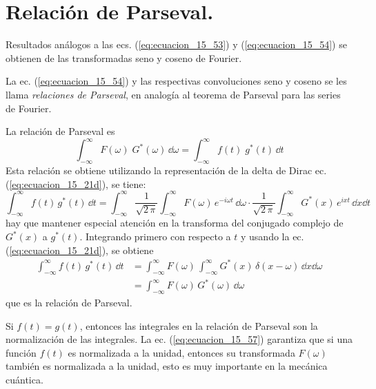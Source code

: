 \section{Relación de Parseval.}
Resultados análogos a las ecs. (\ref{eq:ecuacion_15_53}) y (\ref{eq:ecuacion_15_54}) se obtienen de las transformadas seno y coseno de Fourier.
\par
La ec. (\ref{eq:ecuacion_15_54}) y las respectivas convoluciones seno y coseno se les llama \emph{relaciones de Parseval}, en analogía al teorema de Parseval para las series de Fourier.
\par
La relación de Parseval es
\begin{equation}
\int_{-\infty}^{\infty} F(\omega) \; G^{*} (\omega) \, \dd \omega = \int_{-\infty}^{\infty} f(t) \; g^{*}(t) \, \dd t
\label{eq:ecuacion_15_55}
\end{equation}
Esta relación se obtiene utilizando la representación de la delta de Dirac ec. (\ref{eq:ecuacion_15_21d}), se tiene:
\begin{equation}
\int_{-\infty}^{\infty} f(t) \, g^{*}(t) \, \dd t = \int_{-\infty}^{\infty} \dfrac{1}{\sqrt{2 \, \pi}} \int_{-\infty}^{\infty} F(\omega) \, e^{-i \omega t} \, \dd \omega \cdot \dfrac{1}{\sqrt{2 \, \pi}} \int_{-\infty}^{\infty} G^{*}(x) \, e^{i x t} \, \dd{x} \dd{t}
\label{eq:ecuacion_15_56}
\end{equation}
hay que mantener especial atención en la transforma del conjugado complejo de $G^{*}(x)$ a $g^{*}(t)$. Integrando primero con respecto a $t$ y usando la ec. (\ref{eq:ecuacion_15_21d}), se obtiene
\begin{align}
\int_{-\infty}^{\infty} f(t) \, g^{*}(t) \, \dd t &= \int_{-\infty}^{\infty} F(\omega) \, \int_{-\infty}^{\infty} G^{*} (x) \, \delta (x - \omega) \, \dd{x} \dd{\omega} \nonumber \\
&= \int_{-\infty}^{\infty} F(\omega) \, G^{*} (\omega) \,\dd \omega
\label{eq:ecuacion_15_57}
\end{align}
que es la relación de Parseval.
\par
Si $f(t) = g(t)$, entonces las integrales en la relación de Parseval son la normalización de las integrales. La ec. (\ref{eq:ecuacion_15_57}) garantiza que si una función $f(t)$ es normalizada a la unidad, entonces su transformada $F(\omega)$ también es normalizada a la unidad, esto es muy importante en la mecánica cuántica.
